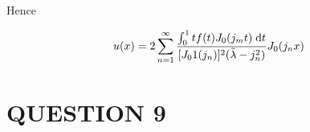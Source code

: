 \documentclass[a4paper]{article}
\begin{document}
\begin{enumerate}
Hence

\[ u(x) = 2 \sum_{n=1}^{\infty} \frac{\int_{0}^{1}  t f(t) J_{0}(j_{m} t) \; \mathrm{d} t}{ [ J_{0}1(j_{n}) ]^{2}  (\tilde{\lambda}   -j_{n}^{2} )   }J_{0}(j_{n} x)  \]
	
\end{enumerate}









\section{QUESTION 9}
\end{document}
